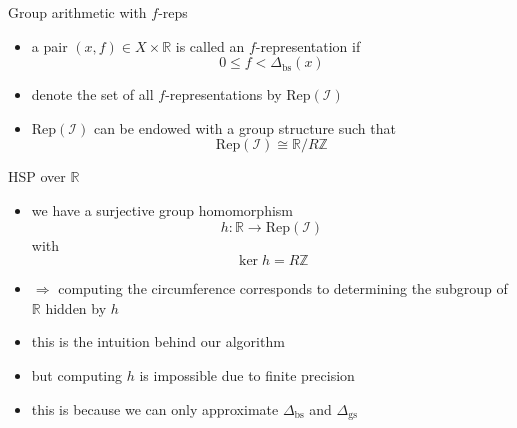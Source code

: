 \documentclass[slideColor]{prosper}
\renewcommand{\R}{\mathbb{R}}
\newcommand{\Z}{\mathbb{Z}}
\renewcommand{\>}{\rangle}
\newcommand{\<}{\langle}
\begin{document}

\begin{slide}{Group arithmetic with $f$-reps}

\begin{itemize}
\item a pair $(x,f)\in X\times \R$ is called an $f$-representation if 
\[
0 \le f < \Delta_{\mathrm{bs}}(x)
\]

\medskip
\item denote the set of all $f$-representations by $\mathrm{Rep}(\mathcal{I})$

\medskip
\item $\mathrm{Rep}(\mathcal{I})$ can be endowed with a group structure such that 
\[
\mathrm{Rep}(\mathcal{I}) \cong \R/R\Z
\]
\end{itemize}
\end{slide}


\begin{slide}{HSP over $\R$}

\begin{itemize}
\item we have a surjective group homomorphism
\[
h : \R \rightarrow \mathrm{Rep}(\mathcal{I})
\]
with 
\[
\ker h = R \Z
\]

\medskip
\item $\Rightarrow$ computing the circumference corresponds to determining the subgroup of $\R$ hidden by $h$

\medskip
\item this is the intuition behind our algorithm

\medskip
\item but computing $h$ is impossible due to finite precision

\medskip
\item this is because we can only approximate $\Delta_{\mathrm{bs}}$ and $\Delta_{\mathrm{gs}}$
\end{itemize}

\end{slide}

\end{document}
